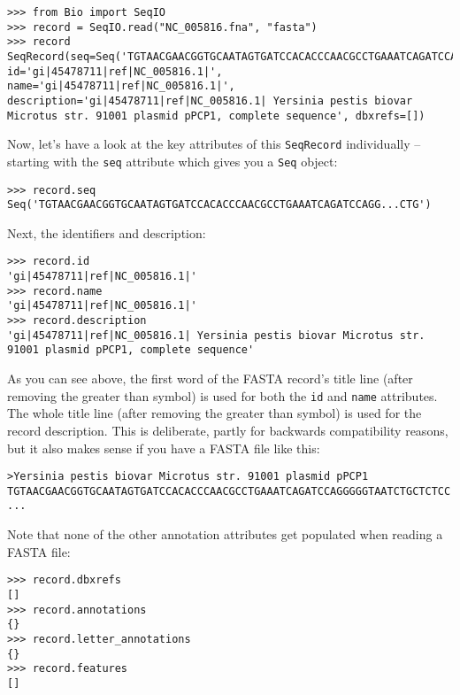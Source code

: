 \begin{verbatim}
>>> from Bio import SeqIO
>>> record = SeqIO.read("NC_005816.fna", "fasta")
>>> record
SeqRecord(seq=Seq('TGTAACGAACGGTGCAATAGTGATCCACACCCAACGCCTGAAATCAGATCCAGG...CTG'), id='gi|45478711|ref|NC_005816.1|', name='gi|45478711|ref|NC_005816.1|', description='gi|45478711|ref|NC_005816.1| Yersinia pestis biovar Microtus str. 91001 plasmid pPCP1, complete sequence', dbxrefs=[])
\end{verbatim}

Now, let's have a look at the key attributes of this \verb|SeqRecord|
individually -- starting with the \verb|seq| attribute which gives you a
\verb|Seq| object:

\begin{verbatim}
>>> record.seq
Seq('TGTAACGAACGGTGCAATAGTGATCCACACCCAACGCCTGAAATCAGATCCAGG...CTG')
\end{verbatim}

Next, the identifiers and description:

\begin{verbatim}
>>> record.id
'gi|45478711|ref|NC_005816.1|'
>>> record.name
'gi|45478711|ref|NC_005816.1|'
>>> record.description
'gi|45478711|ref|NC_005816.1| Yersinia pestis biovar Microtus str. 91001 plasmid pPCP1, complete sequence'
\end{verbatim}

As you can see above, the first word of the FASTA record's title line (after
removing the greater than symbol) is used for both the \verb|id| and
\verb|name| attributes. The whole title line (after removing the greater than
symbol) is used for the record description. This is deliberate, partly for
backwards compatibility reasons, but it also makes sense if you have a FASTA
file like this:

\begin{verbatim}
>Yersinia pestis biovar Microtus str. 91001 plasmid pPCP1
TGTAACGAACGGTGCAATAGTGATCCACACCCAACGCCTGAAATCAGATCCAGGGGGTAATCTGCTCTCC
...
\end{verbatim}

Note that none of the other annotation attributes get populated when reading a
FASTA file:

\begin{verbatim}
>>> record.dbxrefs
[]
>>> record.annotations
{}
>>> record.letter_annotations
{}
>>> record.features
[]
\end{verbatim}


